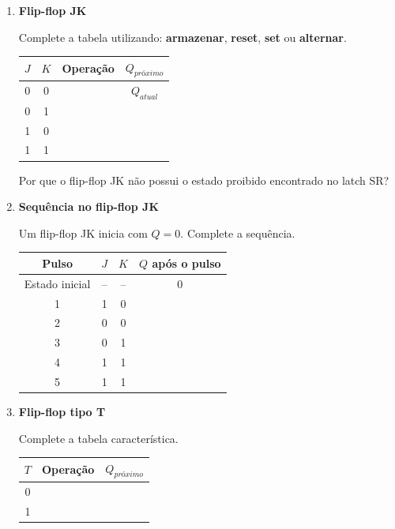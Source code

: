 \documentclass[a4paper,12pt]{article}
\begin{document}
\begin{enumerate}[leftmargin=0.8cm,label=\textbf{\arabic*.},itemsep=0.65cm]
\item \textbf{Flip-flop JK}

Complete a tabela utilizando: \textbf{armazenar}, \textbf{reset}, \textbf{set}
ou \textbf{alternar}.

\begin{center}
\renewcommand{\arraystretch}{1.5}
\begin{tabular}{|c|c|c|c|}
\hline
$J$ & $K$ & \textbf{Operação} & $Q_{próximo}$ \\
\hline
0 & 0 & & $Q_{atual}$ \\
\hline
0 & 1 & & \\
\hline
1 & 0 & & \\
\hline
1 & 1 & & \\
\hline
\end{tabular}
\end{center}

Por que o flip-flop JK não possui o estado proibido encontrado no latch SR?

\vspace{1cm}

\item \textbf{Sequência no flip-flop JK}

Um flip-flop JK inicia com $Q=0$. Complete a sequência.

\begin{center}
\renewcommand{\arraystretch}{1.5}
\begin{tabular}{|c|c|c|c|}
\hline
\textbf{Pulso} & $J$ & $K$ & $Q$ após o pulso \\
\hline
Estado inicial & -- & -- & 0 \\
\hline
1 & 1 & 0 & \\
\hline
2 & 0 & 0 & \\
\hline
3 & 0 & 1 & \\
\hline
4 & 1 & 1 & \\
\hline
5 & 1 & 1 & \\
\hline
\end{tabular}
\end{center}

\item \textbf{Flip-flop tipo T}

Complete a tabela característica.

\begin{center}
\renewcommand{\arraystretch}{1.5}
\begin{tabular}{|c|c|c|}
\hline
$T$ & \textbf{Operação} & $Q_{próximo}$ \\
\hline
0 & & \\
\hline
1 & & \\
\hline
\end{tabular}
\end{center}


\end{enumerate}
\end{document}
